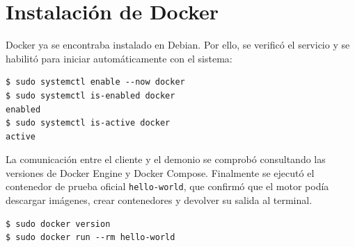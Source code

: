 \section{Instalación de Docker}

Docker ya se encontraba instalado en Debian. Por ello, se verificó el servicio
y se habilitó para iniciar automáticamente con el sistema:

\begin{lstlisting}[style=terminal]
$ sudo systemctl enable --now docker
$ sudo systemctl is-enabled docker
enabled
$ sudo systemctl is-active docker
active
\end{lstlisting}

La comunicación entre el cliente y el demonio se comprobó consultando las
versiones de Docker Engine y Docker Compose. Finalmente se ejecutó el contenedor
de prueba oficial \texttt{hello-world}, que confirmó que el motor podía
descargar imágenes, crear contenedores y devolver su salida al terminal.

\begin{lstlisting}[style=terminal]
$ sudo docker version
$ sudo docker run --rm hello-world
\end{lstlisting}

